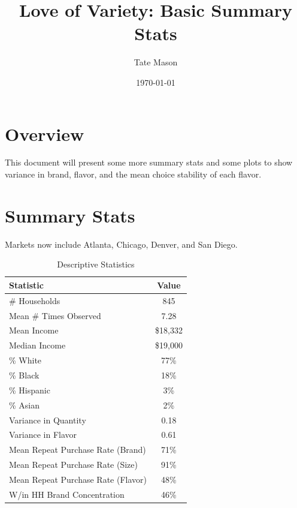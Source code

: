 \documentclass[11pt]{article}
\title{Love of Variety: Basic Summary Stats}
\author{Tate Mason}
\date{\today}
\theoremstyle{definition}
\theoremstyle{remark}
\begin{document}
\maketitle
\thispagestyle{empty}

\section{Overview}

This document will present some more summary stats and some plots to show variance in brand, flavor, and the mean choice stability of each flavor.

\section{Summary Stats}

Markets now include Atlanta, Chicago, Denver, and San Diego. 

\begin{table}[htbp]
    \centering
    \caption{Descriptive Statistics}
    \label{tab:desc_stats}
    \begin{tabular}{lc}
        \toprule
        Statistic & Value \\
        \midrule
        \# Households               & 845 \\
        Mean \# Times Observed      & 7.28 \\
        Mean Income                 & \$18,332 \\
        Median Income               & \$19,000 \\
        \% White                    & 77\% \\
        \% Black                    & 18\% \\
        \% Hispanic                 & 3\% \\
        \% Asian                    & 2\% \\
        Variance in Quantity        & 0.18 \\
        Variance in Flavor          & 0.61 \\
        Mean Repeat Purchase Rate (Brand)   & 71\% \\
        Mean Repeat Purchase Rate (Size)    & 91\% \\
        Mean Repeat Purchase Rate (Flavor)  & 48\% \\
        W/in HH Brand Concentration & 46\%
        \bottomrule
    \end{tabular}
\end{table}
\end{document}
